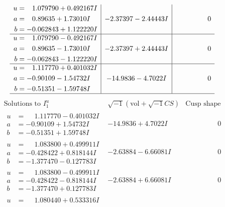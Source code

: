 \documentclass[1p]{elsarticle_modified}
\theoremstyle{definition}
\newcommand{\I}{\sqrt{-1}}
\begin{document}
$$\begin{array}{c|c|c}
\begin{aligned}
u &= \phantom{-}1.079790 + 0.492167 I \\
a &= \phantom{-}0.89635 + 1.73010 I \\
b &= -0.062843 + 1.122220 I\end{aligned}
 & -2.37397 - 2.44443 I & \phantom{-0.000000 } 0 \\ \hline\begin{aligned}
u &= \phantom{-}1.079790 - 0.492167 I \\
a &= \phantom{-}0.89635 - 1.73010 I \\
b &= -0.062843 - 1.122220 I\end{aligned}
 & -2.37397 + 2.44443 I & \phantom{-0.000000 } 0 \\ \hline\begin{aligned}
u &= \phantom{-}1.117770 + 0.401032 I \\
a &= -0.90109 - 1.54732 I \\
b &= -0.51351 - 1.59748 I\end{aligned}
 & -14.9836 - 4.7022 I & \phantom{-0.000000 } 0\\
 \hline 
 \end{array}$$\newpage$$\begin{array}{c|c|c}  
\text{Solutions to }I^u_{1}& \I (\text{vol} + \sqrt{-1}CS) & \text{Cusp shape}\\
 \hline 
\begin{aligned}
u &= \phantom{-}1.117770 - 0.401032 I \\
a &= -0.90109 + 1.54732 I \\
b &= -0.51351 + 1.59748 I\end{aligned}
 & -14.9836 + 4.7022 I & \phantom{-0.000000 } 0 \\ \hline\begin{aligned}
u &= \phantom{-}1.083800 + 0.499911 I \\
a &= -0.428422 + 0.818144 I \\
b &= -1.377470 - 0.127783 I\end{aligned}
 & -2.63884 - 6.66081 I & \phantom{-0.000000 } 0 \\ \hline\begin{aligned}
u &= \phantom{-}1.083800 - 0.499911 I \\
a &= -0.428422 - 0.818144 I \\
b &= -1.377470 + 0.127783 I\end{aligned}
 & -2.63884 + 6.66081 I & \phantom{-0.000000 } 0 \\ \hline\begin{aligned}
u &= \phantom{-}1.080440 + 0.533316 I \\

\end{aligned}
\end{array}$$
\end{document}
